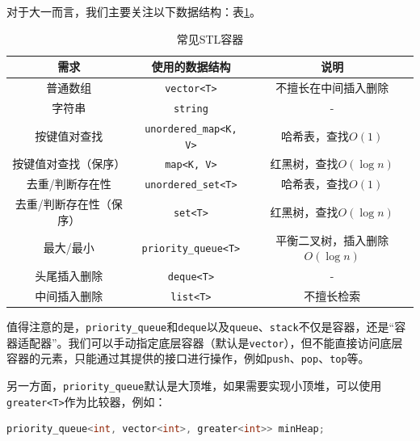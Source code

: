 \documentclass{article}
\begin{document}
对于大一而言，我们主要关注以下数据结构：表\ref{tab:stl}。
\begin{table}[ht]\small
  \centering
  \begin{tabular}{ccc}
    \hline
    需求 & 使用的数据结构 & 说明 \\
    \hline
    普通数组 & \texttt{vector<T>} & 不擅长在中间插入删除 \\
    字符串 & \texttt{string} & - \\
    按键值对查找 & \texttt{unordered\_map<K, V>} & 哈希表，查找$O(1)$  \\
    按键值对查找（保序） & \texttt{map<K, V>} & 红黑树，查找$O(\log n)$  \\
    去重/判断存在性 & \texttt{unordered\_set<T>} & 哈希表，查找$O(1)$ \\
    去重/判断存在性（保序） & \texttt{set<T>} & 红黑树，查找$O(\log n)$ \\
    最大/最小 & \texttt{priority\_queue<T>} & 平衡二叉树，插入删除$O(\log n)$\\
    头尾插入删除 & \texttt{deque<T>} & - \\
    中间插入删除 & \texttt{list<T>} & 不擅长检索 \\
    \hline
  \end{tabular}
  \caption{常见STL容器}
  \label{tab:stl}
\end{table}

值得注意的是，\texttt{priority\_queue}和\texttt{deque}以及\texttt{queue}、\texttt{stack}不仅是容器，还是“容器适配器”。我们可以手动指定底层容器（默认是\texttt{vector}），但不能直接访问底层容器的元素，只能通过其提供的接口进行操作，例如\texttt{push}、\texttt{pop}、\texttt{top}等。

另一方面，\texttt{priority\_queue}默认是大顶堆，如果需要实现小顶堆，可以使用\texttt{greater<T>}作为比较器，例如：
\begin{lstlisting}[language=C++]
priority_queue<int, vector<int>, greater<int>> minHeap;
\end{lstlisting}
\end{document}
